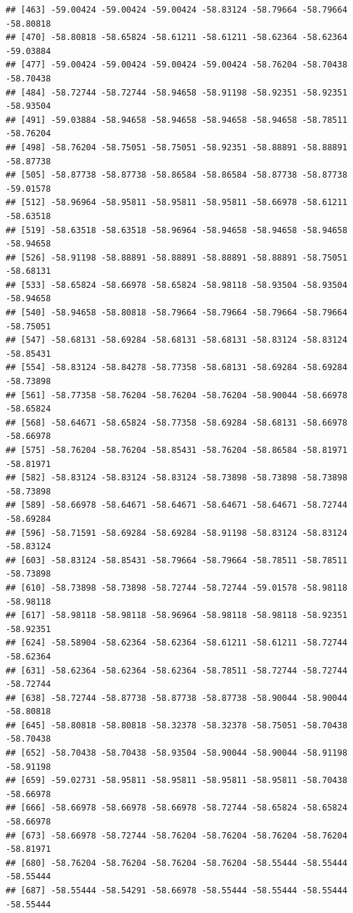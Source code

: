 \documentclass[
]{article}
\begin{document}
\begin{verbatim}
## [463] -59.00424 -59.00424 -59.00424 -58.83124 -58.79664 -58.79664 -58.80818
## [470] -58.80818 -58.65824 -58.61211 -58.61211 -58.62364 -58.62364 -59.03884
## [477] -59.00424 -59.00424 -59.00424 -59.00424 -58.76204 -58.70438 -58.70438
## [484] -58.72744 -58.72744 -58.94658 -58.91198 -58.92351 -58.92351 -58.93504
## [491] -59.03884 -58.94658 -58.94658 -58.94658 -58.94658 -58.78511 -58.76204
## [498] -58.76204 -58.75051 -58.75051 -58.92351 -58.88891 -58.88891 -58.87738
## [505] -58.87738 -58.87738 -58.86584 -58.86584 -58.87738 -58.87738 -59.01578
## [512] -58.96964 -58.95811 -58.95811 -58.95811 -58.66978 -58.61211 -58.63518
## [519] -58.63518 -58.63518 -58.96964 -58.94658 -58.94658 -58.94658 -58.94658
## [526] -58.91198 -58.88891 -58.88891 -58.88891 -58.88891 -58.75051 -58.68131
## [533] -58.65824 -58.66978 -58.65824 -58.98118 -58.93504 -58.93504 -58.94658
## [540] -58.94658 -58.80818 -58.79664 -58.79664 -58.79664 -58.79664 -58.75051
## [547] -58.68131 -58.69284 -58.68131 -58.68131 -58.83124 -58.83124 -58.85431
## [554] -58.83124 -58.84278 -58.77358 -58.68131 -58.69284 -58.69284 -58.73898
## [561] -58.77358 -58.76204 -58.76204 -58.76204 -58.90044 -58.66978 -58.65824
## [568] -58.64671 -58.65824 -58.77358 -58.69284 -58.68131 -58.66978 -58.66978
## [575] -58.76204 -58.76204 -58.85431 -58.76204 -58.86584 -58.81971 -58.81971
## [582] -58.83124 -58.83124 -58.83124 -58.73898 -58.73898 -58.73898 -58.73898
## [589] -58.66978 -58.64671 -58.64671 -58.64671 -58.64671 -58.72744 -58.69284
## [596] -58.71591 -58.69284 -58.69284 -58.91198 -58.83124 -58.83124 -58.83124
## [603] -58.83124 -58.85431 -58.79664 -58.79664 -58.78511 -58.78511 -58.73898
## [610] -58.73898 -58.73898 -58.72744 -58.72744 -59.01578 -58.98118 -58.98118
## [617] -58.98118 -58.98118 -58.96964 -58.98118 -58.98118 -58.92351 -58.92351
## [624] -58.58904 -58.62364 -58.62364 -58.61211 -58.61211 -58.72744 -58.62364
## [631] -58.62364 -58.62364 -58.62364 -58.78511 -58.72744 -58.72744 -58.72744
## [638] -58.72744 -58.87738 -58.87738 -58.87738 -58.90044 -58.90044 -58.80818
## [645] -58.80818 -58.80818 -58.32378 -58.32378 -58.75051 -58.70438 -58.70438
## [652] -58.70438 -58.70438 -58.93504 -58.90044 -58.90044 -58.91198 -58.91198
## [659] -59.02731 -58.95811 -58.95811 -58.95811 -58.95811 -58.70438 -58.66978
## [666] -58.66978 -58.66978 -58.66978 -58.72744 -58.65824 -58.65824 -58.66978
## [673] -58.66978 -58.72744 -58.76204 -58.76204 -58.76204 -58.76204 -58.81971
## [680] -58.76204 -58.76204 -58.76204 -58.76204 -58.55444 -58.55444 -58.55444
## [687] -58.55444 -58.54291 -58.66978 -58.55444 -58.55444 -58.55444 -58.55444

\end{verbatim}
\end{document}
